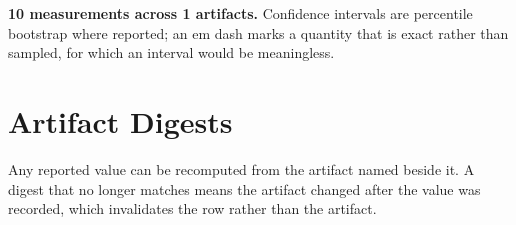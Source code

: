 \documentclass[10pt,journal,compsoc,twocolumn]{IEEEtran}
\begin{document}
\textbf{10 measurements across 1 artifacts.} Confidence intervals are percentile bootstrap where reported; an em dash marks a quantity that is exact rather than sampled, for which an interval would be meaningless.


\section{Artifact Digests}
\begin{table}[htbp]
\centering
{}
\end{table}

Any reported value can be recomputed from the artifact named beside it. A digest that no longer matches means the artifact changed after the value was recorded, which invalidates the row rather than the artifact.


\par\vspace{0.5em}



\end{document}
